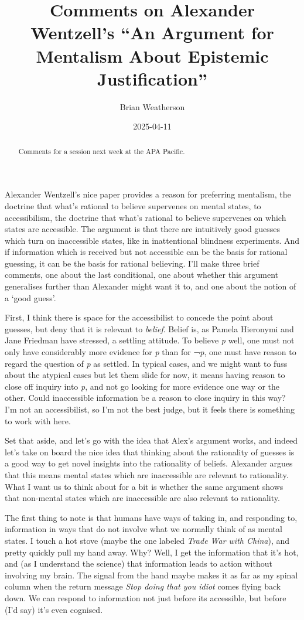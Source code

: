 \documentclass[
  11pt,
  letterpaper,
  DIV=11,
  numbers=noendperiod,
  twoside]{scrartcl}
\title{Comments on Alexander Wentzell's ``An Argument for Mentalism
About Epistemic Justification''}
\author{Brian Weatherson}
\date{2025-04-11}
\begin{document}
\maketitle
\begin{abstract}
Comments for a session next week at the APA Pacific.
\end{abstract}


Alexander Wentzell's nice paper provides a reason for preferring
mentalism, the doctrine that what's rational to believe supervenes on
mental states, to accessibilism, the doctrine that what's rational to
believe supervenes on which states are accessible. The argument is that
there are intuitively good guesses which turn on inaccessible states,
like in inattentional blindness experiments. And if information which is
received but not accessible can be the basis for rational guessing, it
can be the basis for rational believing. I'll make three brief comments,
one about the last conditional, one about whether this argument
generalises further than Alexander might want it to, and one about the
notion of a `good guess'.

First, I think there is space for the accessibilist to concede the point
about guesses, but deny that it is relevant to \emph{belief}. Belief is,
as Pamela Hieronymi and Jane Friedman have stressed, a settling
attitude. To believe \emph{p} well, one must not only have considerably
more evidence for \emph{p} than for ¬\emph{p}, one must have reason to
regard the question of \emph{p} as settled. In typical cases, and we
might want to fuss about the atypical cases but let them slide for now,
it means having reason to close off inquiry into \emph{p}, and not go
looking for more evidence one way or the other. Could inaccessible
information be a reason to close inquiry in this way? I'm not an
accessibilist, so I'm not the best judge, but it feels there is
something to work with here.

Set that aside, and let's go with the idea that Alex's argument works,
and indeed let's take on board the nice idea that thinking about the
rationality of guesses is a good way to get novel insights into the
rationality of beliefs. Alexander argues that this means mental states
which are inaccessible are relevant to rationality. What I want us to
think about for a bit is whether the same argument shows that non-mental
states which are inaccessible are also relevant to rationality.

The first thing to note is that humans have ways of taking in, and
responding to, information in ways that do not involve what we normally
think of as mental states. I touch a hot stove (maybe the one labeled
\emph{Trade War with China}), and pretty quickly pull my hand away. Why?
Well, I get the information that it's hot, and (as I understand the
science) that information leads to action without involving my brain.
The signal from the hand maybe makes it as far as my spinal column when
the return message \emph{Stop doing that you idiot} comes flying back
down. We can respond to information not just before its accessible, but
before (I'd say) it's even cognised.
\end{document}
